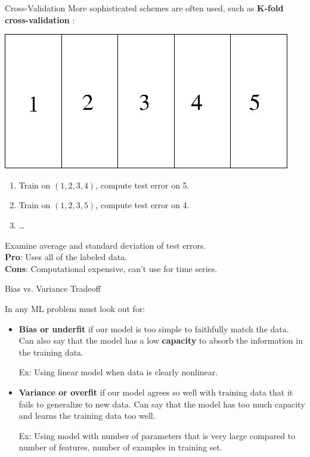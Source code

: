 \documentclass[12pt,t]{beamer}
\begin{document}
\begin{frame}{Cross-Validation}
More sophisticated schemes are often used, such as {\bf K-fold cross-validation} :
\centerline{
\includegraphics[height=0.25\textheight]{images/crossval.png}
}
\noindent
\begin{enumerate}
\item Train on $(1,2,3,4)$, compute test error on 5.
\item Train on $(1,2,3,5)$, compute test error on 4.
\item \ldots
\end{enumerate}
Examine average and standard deviation of test errors. \\
{\bf Pro}: Uses all of the labeled data. \\
{\bf Cons}: Computational expensive, can't use for time series.
\end{frame}

\begin{frame}{Bias vs. Variance Tradeoff} 

In any ML problem must look out for:
\begin{itemize}
\item {\bf Bias or underfit} if our model is too simple to faithfully match the data.   Can also say that the model has a low {\bf capacity} to absorb the information in the training data.
\bigskip

 Ex: Using linear model when data is clearly nonlinear.

\bigskip 

\item {\bf Variance or overfit} if our model agrees so well with training data that it fails to generalize to new data.  Can say that the model has too much capacity and learns the training data too well.

\bigskip 
Ex: Using model with number of parameters that is very large compared to number of features, number of examples in training set.
\end{itemize}

\end{frame}
\end{document}
